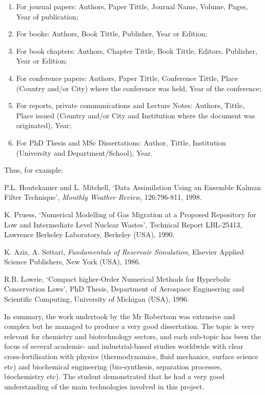 \documentclass[14pt,twoside]{report}
\begin{document}
\begin{enumerate}
\begin{enumerate}
\item For journal papers: Authors, Paper Tittle, Journal Name, Volume, Pages, Year of publication;
\item For books: Authors, Book Tittle, Publisher, Year or Edition;
\item For book chapters: Authors, Chapter Tittle, Book Tittle, Editors, Publisher, Year or Edition;
\item For conference papers: Authors, Paper Tittle, Conference Tittle, Place (Country and/or City) where the conference was held, Year of the conference;
\item For reports, private communications and Lecture Notes: Authors, Tittle, Place issued (Country and/or City and Institution where the document was originated), Year;
\item For PhD Thesis and MSc Dissertations: Author, Tittle, Institution (University and Department/School), Year.
\end{enumerate}  
Thus, for example:
\begin{enumerate}[label={[\arabic*]}]
\item P.L. Houtekamer and L. Mitchell, `Data Assimilation Using an Ensemble Kalman Filter Technique', {\it Monthly Weather Review}, 126:796-811, 1998.
\item K. Pruess, `Numerical Modelling of Gas Migration at a Proposed Repository for Low and Intermediate Level Nuclear Wastes', Technical Report LBL-25413, Lawrence Berkeley Laboratory, Berkeley (USA), 1990.
\item K. Aziz, A. Settari, {\it Fundamentals of Reservoir Simulation}, Elsevier Applied Science Publishers, New York (USA), 1986.
\item R.B. Lowrie, `Compact higher-Order Numerical Methods for Hyperbolic Conservation Laws', PhD Thesis, Department of Aerospace Engineering and Scientific Computing, University of Michigan (USA), 1996.
\end{enumerate}
%
\end{enumerate}
In summary, the work undertook by the Mr Robertson was extensive and complex but he managed to produce a very good dissertation. The topic is very relevant for chemistry and biotechnology sectors, and each sub-topic has been the focus of several academic- and industrial-based studies worldwide with clear cross-fertilisation with physics (thermodynamics, fluid mechanics, surface science etc) and biochemical engineering (bio-synthesis, separation processes, biochemistry etc). The student demonstrated that he had a very good understanding of the main technologies involved in this project.
\end{document}
